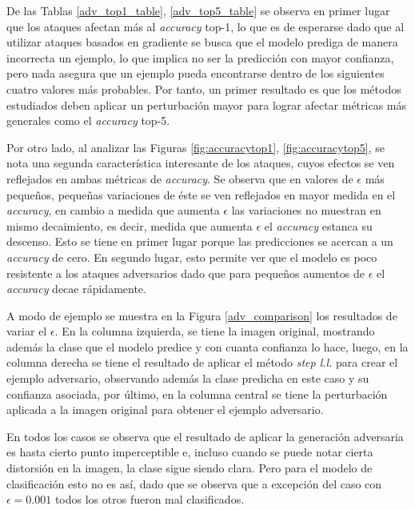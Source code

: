 \documentclass[conference]{IEEEtran}
\begin{document}
De las Tablas \ref{adv_top1_table}, \ref{adv_top5_table} se observa en primer lugar que los ataques afectan más al \textit{accuracy} top-1, lo que es de esperarse dado que al utilizar ataques basados en gradiente se busca que el modelo prediga de manera incorrecta un ejemplo, lo que implica no ser la predicción con mayor confianza, pero nada asegura que un ejemplo pueda encontrarse dentro de los siguientes cuatro valores más probables. Por tanto, un primer resultado es que los métodos estudiados deben aplicar un perturbación mayor para lograr afectar métricas más generales como el \textit{accuracy} top-5.

Por otro lado, al analizar las Figuras \ref{fig:accuracytop1}, \ref{fig:accuracytop5}, se nota una segunda característica interesante de los ataques, cuyos efectos se ven reflejados en ambas métricas de \textit{accuracy}. Se observa que en valores de $\epsilon$ más pequeños, pequeñas variaciones de éste se ven reflejados en mayor medida en el \textit{accuracy}, en cambio a medida que aumenta $\epsilon$ las variaciones no muestran en mismo decaimiento, es decir, medida que aumenta $\epsilon$ el \textit{accuracy} estanca su descenso. Esto se tiene en primer lugar porque las predicciones se acercan a un \textit{accuracy} de cero. En segundo lugar, esto permite ver que el modelo es poco resistente a los ataques adversarios dado que para pequeños aumentos de $\epsilon$ el \textit{accuracy} decae rápidamente.

A modo de ejemplo se muestra en la Figura \ref{adv_comparison} los resultados de variar el $\epsilon$. En la columna izquierda, se tiene la imagen original, mostrando además la clase que el modelo predice y con cuanta confianza lo hace, luego, en la columna derecha se tiene el resultado de aplicar el método \textit{step l.l.} para crear el ejemplo adversario, observando además la clase predicha en este caso y su confianza asociada, por último, en la columna central se tiene la perturbación aplicada a la imagen original para obtener el ejemplo adversario.

En todos los casos se observa que el resultado de aplicar la generación adversaria es hasta cierto punto imperceptible e, incluso cuando se puede notar cierta distorsión en la imagen, la clase sigue siendo clara. Pero para el modelo de clasificación esto no es así, dado que se observa que a excepción del caso con $\epsilon=0.001$ todos los otros fueron mal clasificados.


\end{document}

